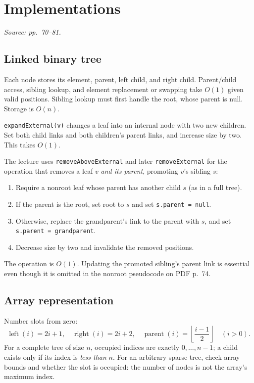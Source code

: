 \documentclass[11pt]{article}
\begin{document}
\section{Implementations}
\textit{Source: pp.\ 70--81.}

\subsection{Linked binary tree}
Each node stores its element, parent, left child, and right child. Parent/child access, sibling lookup, and element replacement or swapping take $O(1)$ given valid positions. Sibling lookup must first handle the root, whose parent is null. Storage is $O(n)$.

\texttt{expandExternal(v)} changes a leaf into an internal node with two new children. Set both child links and both children's parent links, and increase size by two. This takes $O(1)$.

The lecture uses \texttt{removeAboveExternal} and later \texttt{removeExternal} for the operation that removes a leaf $v$ \emph{and its parent}, promoting $v$'s sibling $s$:
\begin{enumerate}
\item Require a nonroot leaf whose parent has another child $s$ (as in a full tree).
\item If the parent is the root, set root to $s$ and set \texttt{s.parent = null}.
\item Otherwise, replace the grandparent's link to the parent with $s$, and set \texttt{s.parent = grandparent}.
\item Decrease size by two and invalidate the removed positions.
\end{enumerate}
The operation is $O(1)$. Updating the promoted sibling's parent link is essential even though it is omitted in the nonroot pseudocode on PDF p.\ 74.

\subsection{Array representation}
Number slots from zero:
\[
\operatorname{left}(i)=2i+1,\quad
\operatorname{right}(i)=2i+2,\quad
\operatorname{parent}(i)=\left\lfloor\frac{i-1}{2}\right\rfloor\quad(i>0).
\]
For a complete tree of size $n$, occupied indices are exactly $0,\ldots,n-1$; a child exists only if its index is \emph{less than} $n$. For an arbitrary sparse tree, check array bounds and whether the slot is occupied: the number of nodes is not the array's maximum index.
\end{document}
